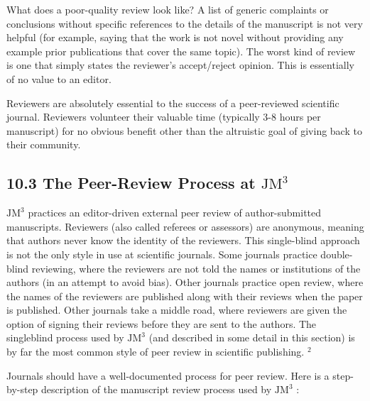 What does a poor-quality review look like? A list of generic complaints or conclusions without specific references to the details of the manuscript is not very helpful (for example, saying that the work is not novel without providing any example prior publications that cover the same topic). The worst kind of review is one that simply states the reviewer's accept/reject opinion. This is essentially of no value to an editor.

Reviewers are absolutely essential to the success of a peer-reviewed scientific journal. Reviewers volunteer their valuable time (typically 3-8 hours per manuscript) for no obvious benefit other than the altruistic goal of giving back to their community.

\subsection*{10.3 The Peer-Review Process at $\mathrm{JM}^{3}$}
$\mathrm{JM}^{3}$ practices an editor-driven external peer review of author-submitted manuscripts. Reviewers (also called referees or assessors) are anonymous, meaning that authors never know the identity of the reviewers. This single-blind approach is not the only style in use at scientific journals. Some journals practice double-blind reviewing, where the reviewers are not told the names or institutions of the authors (in an attempt to avoid bias). Other journals practice open review, where the names of the reviewers are published along with their reviews when the paper is published. Other journals take a middle road, where reviewers are given the option of signing their reviews before they are sent to the authors. The singleblind process used by $\mathrm{JM}^{3}$ (and described in some detail in this section) is by far the most common style of peer review in scientific publishing. ${ }^{2}$

Journals should have a well-documented process for peer review. Here is a step-by-step description of the manuscript review process used by $\mathrm{JM}^{3}$ :

